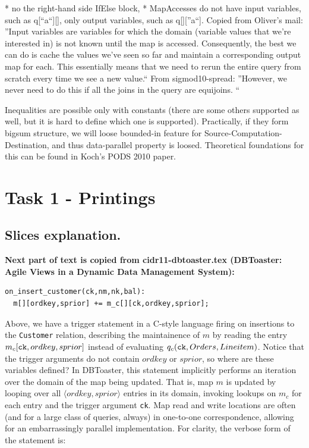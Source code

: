 \documentclass{sig-semester}
\newcommand{\tuple}[1]{{\langle#1\rangle}}
\begin{document}
* no the right-hand side IfElse block,   
* MapAccesses do not have input variables, such as q[``a``][], only output variables, such as q[][''a``]. Copied from Oliver's mail: ''Input variables are variables for which the domain (variable values that we're interested in) is not known until the map is accessed.  Consequently, the best we can do is cache the values we've seen so far and maintain a corresponding output map for each.  This essentially means that we need to rerun the entire query from scratch every time we see a new value.`` From sigmod10-spread: ''However, we never need to do this if all the joins in the query are equijoins. `` 

Inequalities are possible only with constants (there are some others supported as well, but it is hard to define which one is supported). Practically, if they form bigsum structure, we will loose bounded-in feature for Source-Computation-Destination, and thus data-parallel property is loosed. Theoretical foundations for this can be found in Koch's PODS 2010 paper.

\section{Task 1 - Printings}
\vspace{2mm}

\subsection{Slices explanation.}
\textbf{Next part of text is copied from cidr11-dbtoaster.tex (DBToaster: Agile Views in a Dynamic Data Management System):}

\begin{verbatim}
on_insert_customer(ck,nm,nk,bal):
  m[][ordkey,sprior] += m_c[][ck,ordkey,sprior];
\end{verbatim}

Above, we have a trigger statement in a C-style language firing on insertions to
the {\tt Customer} relation, describing the maintainence of $m$ by reading the
entry $m_c[\mbox{{\tt ck}},ordkey,sprior]$ instead of evaluating $q_c(\mbox{{\tt
ck}}, Orders, Lineitem)$. Notice that the trigger arguments do not contain
$ordkey$ or $sprior$, so where are these variables defined? In DBToaster, this
statement implicitly performs an iteration over the domain of the map being
updated. That is, map $m$ is updated by looping over all $\tuple{ordkey,sprior}$
entries in its domain, invoking lookups on $m_c$ for each entry and the trigger
argument {\tt ck}. Map read and write locations are often (and for a large class
of queries, always) in one-to-one correspondence, allowing for an embarrassingly
parallel implementation. For clarity, the verbose form of the statement is:
\end{document}
